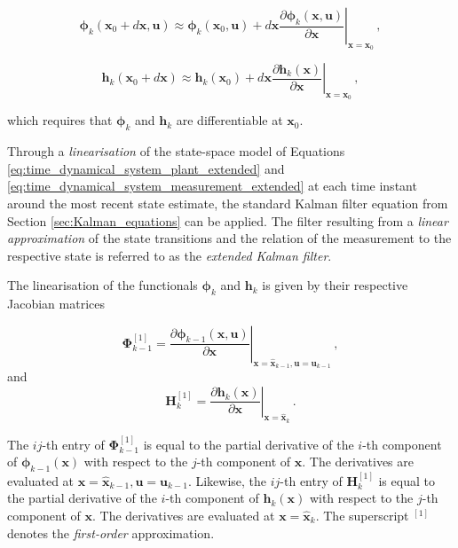 \begin{equation}\label{eq:linear_phi}
  \bm{\phi}_{k}(\mathbf{x}_0 + d \mathbf{x}, \mathbf{u}) \approx \bm{\phi}_{k}(\mathbf{x}_0, \mathbf{u}) + d \mathbf{x} \left. \frac{\partial \bm{\phi}_{k}(\mathbf{x}, \mathbf{u})}{\partial \mathbf{x}} \right|_{\mathbf{x} = \mathbf{x}_0}\,,
\end{equation}

\begin{equation}\label{eq:linear_h}
  \mathbf{h}_{k}(\mathbf{x}_0 + d \mathbf{x}) \approx \mathbf{h}_{k}(\mathbf{x}_0) + d \mathbf{x} \left. \frac{\partial \mathbf{h}_{k}(\mathbf{x})}{\partial \mathbf{x}} \right|_{\mathbf{x} = \mathbf{x}_0}\,,
\end{equation}

\noindent
which requires that $\bm{\phi}_k$ and $\mathbf{h}_k$ are differentiable at $\mathbf{x}_0$.

Through a \emph{linearisation} of the state-space model of Equations \ref{eq:time_dynamical_system_plant_extended} and \ref{eq:time_dynamical_system_measurement_extended} at each time instant around the most recent state estimate, the standard Kalman filter equation from Section \ref{sec:Kalman_equations} can be applied. The filter resulting from a \emph{linear approximation} of the state transitions and the relation of the measurement to the respective state is referred to as the \emph{extended Kalman filter}.

The linearisation of the functionals $\bm{\phi}_k$ and $\mathbf{h}_k$ is given by their respective Jacobian matrices  

\begin{equation}\label{eq:Phi_first_order}
  \bm{\Phi}^{[1]}_{k-1} =  \left. \frac{\partial \bm{\phi}_{k-1}(\mathbf{x}, \mathbf{u})}{\partial \mathbf{x}} \right|_{\mathbf{x}=\hat{\mathbf{x}}_{k-1}, \mathbf{u} = \mathbf{u}_{k-1}} \,,
\end{equation}
and
\begin{equation}\label{eq:H_first_order}
  \mathbf{H}^{[1]}_{k} = \left. \frac{\partial \mathbf{h}_{k}(\mathbf{x})}{\partial \mathbf{x}} \right|_{\mathbf{x}=\hat{\mathbf{x}}_{k}} \,.
\end{equation}

\noindent
The $ij$-th entry of $\bm{\Phi}^{[1]}_{k-1}$ is equal to the partial derivative of the $i$-th component of $\bm{\phi}_{k-1}(\mathbf{x})$ with respect to the $j$-th component of $\mathbf{x}$. The derivatives are evaluated at $\mathbf{x}=\hat{\mathbf{x}}_{k-1}, \mathbf{u} = \mathbf{u}_{k-1}$. Likewise, the $ij$-th entry of $\mathbf{H}^{[1]}_{k}$ is equal to the partial derivative of the $i$-th component of $\mathbf{h}_{k}(\mathbf{x})$ with respect to the $j$-th component of $\mathbf{x}$. The derivatives are evaluated at $\mathbf{x}=\hat{\mathbf{x}}_{k}$. The superscript $^{[1]}$ denotes the \emph{first-order} approximation.


